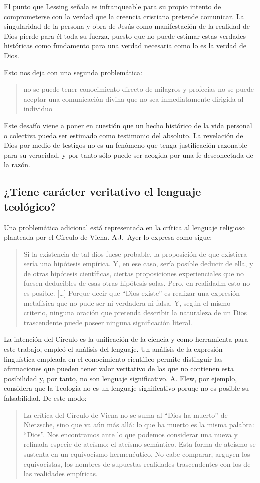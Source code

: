 El punto que Lessing señala es infranqueable para su propio intento de
comprometerse con la verdad que la creencia cristiana pretende comunicar. La
singularidad de la persona y obra de Jesús como manifestación de la realidad de
Dios pierde para él toda su fuerza, puesto que no puede estimar estas verdades
históricas como fundamento para una verdad necesaria como lo es la verdad de
Dios.

Esto nos deja con una segunda problemática:

\blockquote[{\cite[294]{prades2015testimonio}}]{no se puede tener conocimiento
  directo de milagros y profecías \textelp{} no se puede aceptar una
  comunicación divina que no sea inmediatamente dirigida al individuo}.

Este desafío viene a poner en cuestión que un hecho histórico de la vida
personal o colectiva pueda ser estimado como testimonio del absoluto. La
revelación de Dios por medio de testigos no es un fenómeno que tenga
justificación razonable para su veracidad, y por tanto sólo puede ser acogida
por una fe desconectada de la razón.

\subsection{¿Tiene carácter veritativo el lenguaje teológico?}
Una problemática adicional está representada en la crítica al lenguaje religioso
planteada por el Círculo de Viena. A\,J.~Ayer lo expresa como sigue:
\blockquote[{\cite[155]{dominguez2009at}}]{Si la existencia de tal dios fuese
  probable, la proposición de que existiera sería una hipótesis empírica. Y, en
  ese caso, sería posible deducir de ella, y de otras hipótesis científicas,
  ciertas proposiciones experienciales que no fuesen deducibles de esas otras
  hipótesis solas. Pero, en realidadm esto no es posible. [\ldots] Porque decir
  que ``Dios existe'' es realizar una expresión metafísica que no pude ser ni
  verdadera ni falsa. Y, según el mismo criterio, ninguna oración que pretenda
  describir la naturaleza de un Dios trascendente puede poseer ninguna
  significación literal.}

La intención del Círculo es la unificación de la ciencia y como herramienta para
este trabajo, empleó el análisis del lenguaje. Un análisis de la expresión
linguística empleada en el conocimiento científico permite distinguir las
afirmaciones que pueden tener valor veritativo de las que no contienen esta
posibilidad y, por tanto, no son lenguaje significativo. A. Flew, por ejemplo,
considera que la Teología no es un lenguaje significativo poruqe no es posible
su falsabilidad. De este modo:
\blockquote[{\cite[155]{dominguez2009at}}]{La crítica del Círculo de Viena no se
  suma al ``Dios ha muerto'' de Nietzsche, sino que va aún más allá: lo que ha
  muerto es la misma palabra: ``Dios''. Nos encontramos ante lo que podemos
  considerar una nueva y refinada especie de ateísmo: el ateísmo semántico. Esta
  forma de ateísmo se sustenta en un equivocismo hermenéutico. No cabe comparar,
  arguyen los equivocistas, los nombres de supuestas realidades trascendentes
  con los de las realidades empíricas.}

